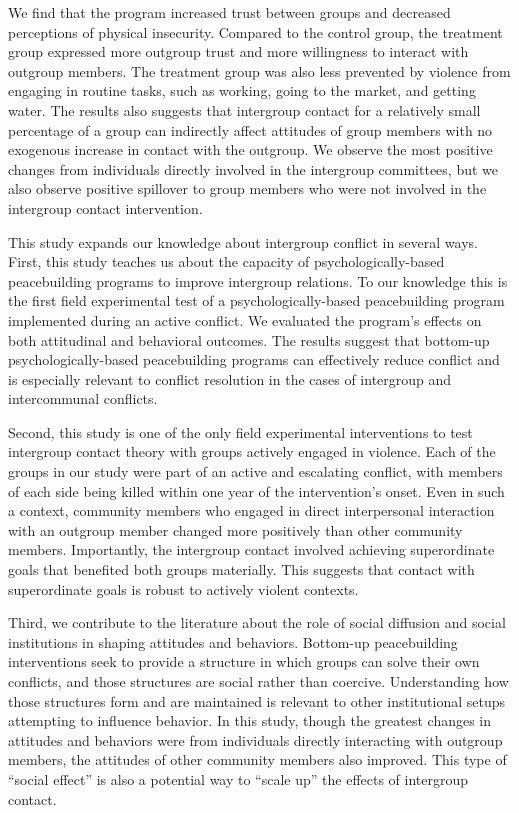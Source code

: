 \documentclass[11pt]{article}
\begin{document}
We find that the program increased trust between groups and decreased
perceptions of physical insecurity. Compared to the control group, the
treatment group expressed more outgroup trust and more willingness to
interact with outgroup members. The treatment group was also less
prevented by violence from engaging in routine tasks, such as working,
going to the market, and getting water. The results also suggests that
intergroup contact for a relatively small percentage of a group can
indirectly affect attitudes of group members with no exogenous increase
in contact with the outgroup. We observe the most positive changes from
individuals directly involved in the intergroup committees, but we also
observe positive spillover to group members who were not involved in the
intergroup contact intervention.

This study expands our knowledge about intergroup conflict in several
ways. First, this study teaches us about the capacity of
psychologically-based peacebuilding programs to improve intergroup
relations. To our knowledge this is the first field experimental test of
a psychologically-based peacebuilding program implemented during an
active conflict. We evaluated the program's effects on both attitudinal
and behavioral outcomes. The results suggest that bottom-up
psychologically-based peacebuilding programs can effectively reduce
conflict and is especially relevant to conflict resolution in the cases
of intergroup and intercommunal conflicts.

Second, this study is one of the only field experimental interventions
to test intergroup contact theory with groups actively engaged in
violence. Each of the groups in our study were part of an active and
escalating conflict, with members of each side being killed within one
year of the intervention's onset. Even in such a context, community
members who engaged in direct interpersonal interaction with an outgroup
member changed more positively than other community members.
Importantly, the intergroup contact involved achieving superordinate
goals that benefited both groups materially. This suggests that contact
with superordinate goals is robust to actively violent contexts.

Third, we contribute to the literature about the role of social
diffusion and social institutions in shaping attitudes and behaviors.
Bottom-up peacebuilding interventions seek to provide a structure in
which groups can solve their own conflicts, and those structures are
social rather than coercive. Understanding how those structures form and
are maintained is relevant to other institutional setups attempting to
influence behavior. In this study, though the greatest changes in
attitudes and behaviors were from individuals directly interacting with
outgroup members, the attitudes of other community members also
improved. This type of ``social effect'' is also a potential way to
``scale up'' the effects of intergroup contact.
\end{document}
